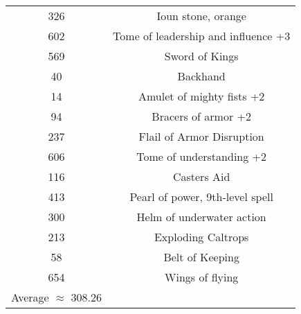 \documentclass[letterpaper, 10pt]{article}
\begin{document}
\begin{center}
\begin{tabular}{|| c c ||}
    326 & Ioun stone, orange\\
    602 & Tome of leadership and influence +3\\
    569 & Sword of Kings\\
    40  & Backhand\\
    14  & Amulet of mighty fists +2\\
    94  & Bracers of armor +2\\
    237 & Flail of Armor Disruption\\
    606 & Tome of understanding +2\\
    116 & Casters Aid\\
    413 & Pearl of power, 9th-level spell\\
    300 & Helm of underwater action\\
    213 & Exploding Caltrops\\
    58  & Belt of Keeping\\
    654 & Wings of flying\\
    \hline
    Average $\approx$ 308.26 & \\
    \hline
    \hline
    \end{tabular}
\end{center}
\newpage
\end{document}
